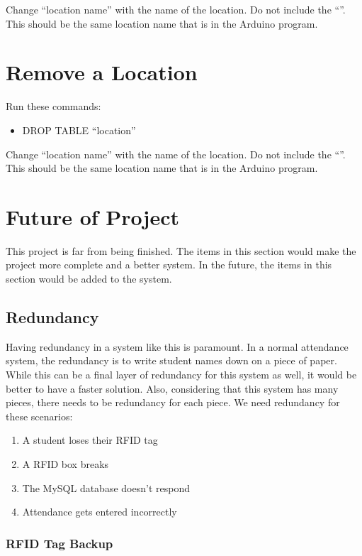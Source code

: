 \documentclass[12pt]{article}
\begin{document}
\begin{spacing}{1.2}
Change ``location name'' with the name of the location. Do not include the ``''. This should be the same location name that is in the Arduino program.


\section{Remove a Location}

Run these commands:
\begin{itemize}
	\item DROP TABLE ``location''
\end{itemize}

Change ``location name'' with the name of the location. Do not include the ``''. This should be the same location name that is in the Arduino program.

\section{Future of Project}

This project is far from being finished. The items in this section would make the project more complete and a better system. In the future, the items in this section would be added to the system.

\subsection{Redundancy}

Having redundancy in a system like this is paramount. In a normal attendance system, the redundancy is to write student names down on a piece of paper. While this can be a final layer of redundancy for this system as well, it would be better to have a faster solution. Also, considering that this system has many pieces, there needs to be redundancy for each piece.
\newline\newline
We need redundancy for these scenarios:
\begin{enumerate}
	\item A student loses their RFID tag
	\item A RFID box breaks
	\item The MySQL database doesn't respond
	\item Attendance gets entered incorrectly
\end{enumerate}

\subsubsection{RFID Tag Backup}


\end{spacing}
\end{document}
